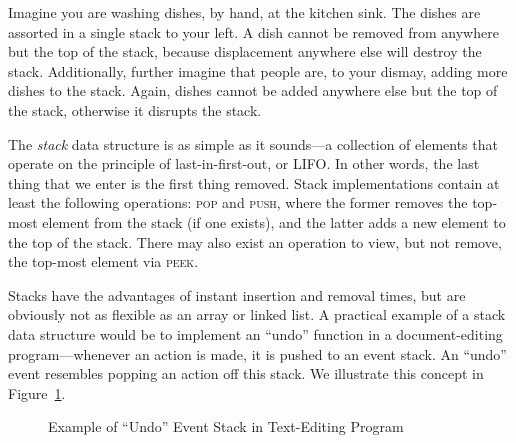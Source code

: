 Imagine you are washing dishes, by hand, at the kitchen sink. 
The dishes are assorted in a single stack to your left. 
A dish cannot be removed from anywhere but the top of the stack, because displacement anywhere else will destroy the stack. 
Additionally, further imagine that people are, to your dismay, adding more dishes to the stack. 
Again, dishes cannot be added anywhere else but the top of the stack, otherwise it disrupts the stack.

The \emph{stack} data structure is as simple as it sounds---a collection of elements that operate on the principle of last-in-first-out, or LIFO. 
In other words, the last thing that we enter is the first thing removed. 
Stack implementations contain at least the following operations: \textsc{pop} and \textsc{push}, where the former removes the top-most element from the stack (if one exists), and the latter adds a new element to the top of the stack. 
There may also exist an operation to view, but not remove, the top-most element via \textsc{peek}. 

Stacks have the advantages of instant insertion and removal times, but are obviously not as flexible as an array or linked list. 
A practical example of a stack data structure would be to implement an ``undo'' function in a document-editing program---whenever an action is made, it is pushed to an event stack. 
An ``undo'' event resembles popping an action off this stack. 
We illustrate this concept in Figure~\ref{fig:stackundo}.

\begin{figure}[ht]
\begin{center}
\end{center}
\caption{Example of ``Undo'' Event Stack in Text-Editing Program}
\label{fig:stackundo}
\end{figure}

